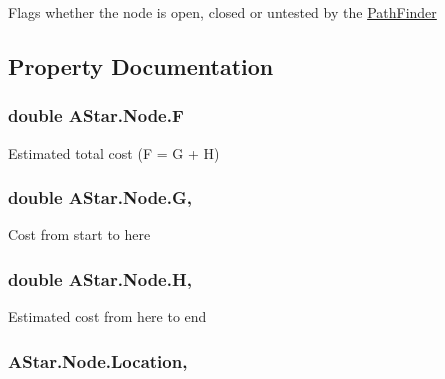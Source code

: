 Flags whether the node is open, closed or untested by the \hyperlink{classAStar_1_1PathFinder}{Path\-Finder} 



\subsection{Property Documentation}
\hypertarget{classAStar_1_1Node_a2093196ab12b8969927bbd441f395558}{
\subsubsection[{F}]{\setlength{\rightskip}{0pt plus 5cm}double A\-Star.\-Node.\-F\hspace{0.3cm}{\ttfamily [get]}}}\label{classAStar_1_1Node_a2093196ab12b8969927bbd441f395558}


Estimated total cost (F = G + H) 

\hypertarget{classAStar_1_1Node_ad35f9676be4b5d25936033f87a490d5d}{
\subsubsection[{G}]{\setlength{\rightskip}{0pt plus 5cm}double A\-Star.\-Node.\-G\hspace{0.3cm}{\ttfamily [get]}, {\ttfamily [set]}}}\label{classAStar_1_1Node_ad35f9676be4b5d25936033f87a490d5d}


Cost from start to here 

\hypertarget{classAStar_1_1Node_ac396e73b68313b7402307f6f41da8179}{
\subsubsection[{H}]{\setlength{\rightskip}{0pt plus 5cm}double A\-Star.\-Node.\-H\hspace{0.3cm}{\ttfamily [get]}, {\ttfamily [set]}}}\label{classAStar_1_1Node_ac396e73b68313b7402307f6f41da8179}


Estimated cost from here to end 

\hypertarget{classAStar_1_1Node_afd917b94b45e7f39ebebb8b180bf16b5}{
\subsubsection[{Location}]{ A\-Star.\-Node.\-Location\hspace{0.3cm}{\ttfamily [get]}, {\ttfamily [set]}}}\label{classAStar_1_1Node_afd917b94b45e7f39ebebb8b180bf16b5}


